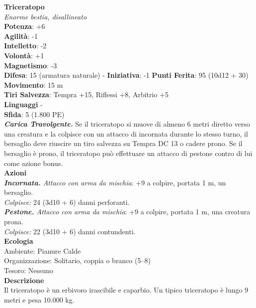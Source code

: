 \begin{multicols}{2}
\medskip\textbf{Triceratopo}\\
\emph{Enorme bestia, disallineato}\\
\textbf{Potenza}: +6\\
\textbf{Agilità}: -1\\
\textbf{Intelletto}: -2\\
\textbf{Volontà}: +1\\
\textbf{Magnetismo}: -3\\
\textbf{Difesa}: 15 (armatura naturale) - \textbf{Iniziativa}: -1
\textbf{Punti Ferita}: 95 (10d12 + 30)\\
\textbf{Movimento}: 15 m\\
\textbf{Tiri Salvezza}: Tempra +15, Riflessi +8, Arbitrio +5\\
\textbf{Linguaggi} -\\
\textbf{Sfida}: 5 (1.800 PE)\smallskip\\
\emph{\textbf{Carica Travolgente.}} Se il triceratopo si muove di almeno 6 metri diretto verso una creatura e la colpisce con un attacco di incornata durante lo stesso turno, il bersaglio deve riuscire un tiro salvezza su Tempra DC 13 o cadere prono. Se il bersaglio è prono, il triceratopo può effettuare un attacco di pestone contro di lui come azione bonus.\\
\smallskip\textbf{Azioni}\\
\emph{\textbf{Incornata.} Attacco con arma da mischia}: +9 a colpire, portata 1 m, un bersaglio.\\
\emph{Colpisce:} 24 (3d10 + 6) danni perforanti.\\
\emph{\textbf{Pestone.} Attacco con arma da mischia}: +9 a colpire, portata 1 m, una creatura prona.\\
\emph{Colpisce:} 22 (3d10 + 6) danni contundenti.\\
\textbf{Ecologia}\\
Ambiente: Pianure Calde\\
Organizzazione: Solitario, coppia o branco (5–8)\\
Tesoro: Nessuno\\
\textbf{Descrizione}\\
Il triceratopo è un erbivoro irascibile e caparbio. Un tipico triceratopo è lungo 9 metri e pesa 10.000 kg.\\


\end{multicols}
